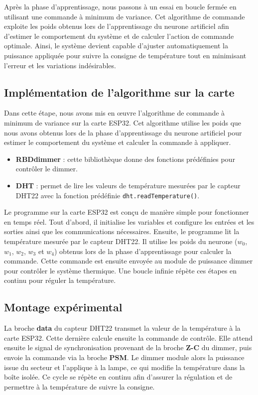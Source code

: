 Après la phase d'apprentissage, nous passons à un essai en boucle fermée en utilisant une commande à minimum de variance. Cet algorithme de commande exploite les poids obtenus lors de l'apprentissage du neurone artificiel afin d'estimer le comportement du système et de calculer l'action de commande optimale. Ainsi, le système devient capable d'ajuster automatiquement la puissance appliquée pour suivre la consigne de température tout en minimisant l'erreur et les variations indésirables.

\subsection{Implémentation de l'algorithme sur la carte}

Dans cette étape, nous avons mis en œuvre l'algorithme de commande à minimum de variance sur la carte ESP32. Cet algorithme utilise les poids que nous avons obtenus lors de la phase d'apprentissage du neurone artificiel pour estimer le comportement du système et calculer la commande à appliquer.

\begin{itemize}[label=$\bullet$]
	\item \textbf{RBDdimmer} : cette bibliothèque donne des fonctions prédéfinies pour contrôler le dimmer.
	\item \textbf{DHT} : permet de lire les valeurs de température mesurées par le capteur DHT22 avec la fonction prédéfinie \texttt{dht.readTemperature()}.
\end{itemize}

Le programme sur la carte ESP32 est conçu de manière simple pour fonctionner en temps réel. Tout d'abord, il initialise les variables et configure les entrées et les sorties ainsi que les communications nécessaires. Ensuite, le programme lit la température mesurée par le capteur DHT22. Il utilise les poids du neurone ($w_0$, $w_1$, $w_2$, $w_3$ et $w_4$) obtenus lors de la phase d'apprentissage pour calculer la commande. Cette commande est ensuite envoyée au module de puissance dimmer pour contrôler le système thermique. Une boucle infinie répète ces étapes en continu pour réguler la température.

\subsection{Montage expérimental}

La broche \textbf{data} du capteur DHT22 transmet la valeur de la température à la carte ESP32. Cette dernière calcule ensuite la commande de contrôle. Elle attend ensuite le signal de synchronisation provenant de la broche \textbf{Z-C} du dimmer, puis envoie la commande via la broche \textbf{PSM}. Le dimmer module alors la puissance issue du secteur et l'applique à la lampe, ce qui modifie la température dans la boîte isolée. Ce cycle se répète en continu afin d'assurer la régulation et de permettre à la température de suivre la consigne.

